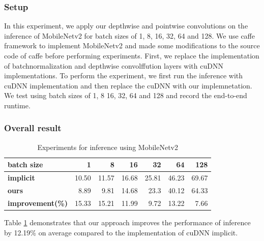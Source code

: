 \subsubsection{Setup} In this experiment, we apply our depthwise and pointwise convolutions on the inference of MobileNetv2 for batch sizes of 1, 8, 16, 32, 64 and 128.
We use caffe framework to implement MobileNetv2 and made some modifications to the source code of caffe before performing experiments. 
First, we replace the implementation of batchnormalization and depthwise convolffution layers with cuDNN implementations. 
To perform the experiment, we first run the inference with cuDNN implementation and then replace the cuDNN with our implemnetation.
We test using batch sizes of 1, 8 16, 32, 64 and 128 and record the end-to-end runtime.
\subsubsection{Overall result}
\begin{table}[]
    \caption{Experiments for inference using MobileNetv2}
    \label{tab:infertime}
    \centering
    \begin{threeparttable}
    \begin{tabular}{l|rrrrrr}
    \toprule
    \textbf{batch} size& 1 & 8 & 16& 32 &64 & 128\\
    \midrule
    \textbf{implicit} & 10.50  & 11.57 & 16.68 & 25.81 &46.23 &69.67  \\
    \textbf{ours} &8.89   &9.81    & 14.68  & 23.3 &40.12 &64.33 \\
    \textbf{improvement(\%)} &15.33   &15.21    & 11.99  & 9.72 &13.22 &7.66 \\
    
    \bottomrule
    \end{tabular}
    \footnotesize
    \end{threeparttable}
    \vspace{-5mm}
\end{table}
Table \ref{tab:infertime} demonstrates that our approach improves the performance of inference by 12.19\% on average compared to the implementation of cuDNN implicit.